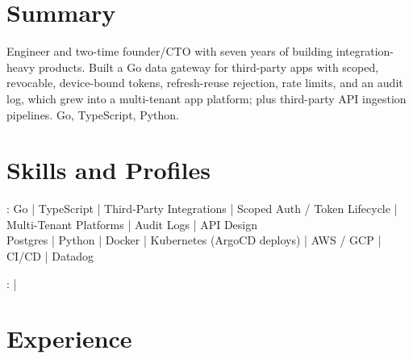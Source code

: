 \documentclass[print]{jack-resume}
\begin{document}
\pagecolor{darkmodeBackground}


\begin{minipage}[t][1cm][t]{.03\textwidth}
    \hfill
\end{minipage}

\section{Summary}
Engineer and two-time founder/CTO with seven years of building integration-heavy products. Built a Go data gateway for third-party apps with scoped, revocable, device-bound tokens, refresh-reuse rejection, rate limits, and an audit log, which grew into a multi-tenant app platform; plus third-party API ingestion pipelines. Go, TypeScript, Python.
\sectionsep

\section{Skills and Profiles}
:
Go \hfill | \hfill
TypeScript \hfill | \hfill
Third-Party Integrations \hfill | \hfill
Scoped Auth / Token Lifecycle \hfill | \hfill
Multi-Tenant Platforms \hfill | \hfill
Audit Logs \hfill | \hfill
API Design \\
\hspace{1.0cm} Postgres \hfill | \hfill
Python \hfill | \hfill
Docker \hfill | \hfill
Kubernetes (ArgoCD deploys) \hfill | \hfill
AWS / GCP \hfill | \hfill
CI/CD \hfill | \hfill
Datadog \\

\raggedright{
    :
      \href{https://www.linkedin.com/in/jack-sturtevant/}{ \ExternalLink} |
     \href{https://github.com/jacksturt}{ \ExternalLink}}

\section{Experience}
\end{document}
